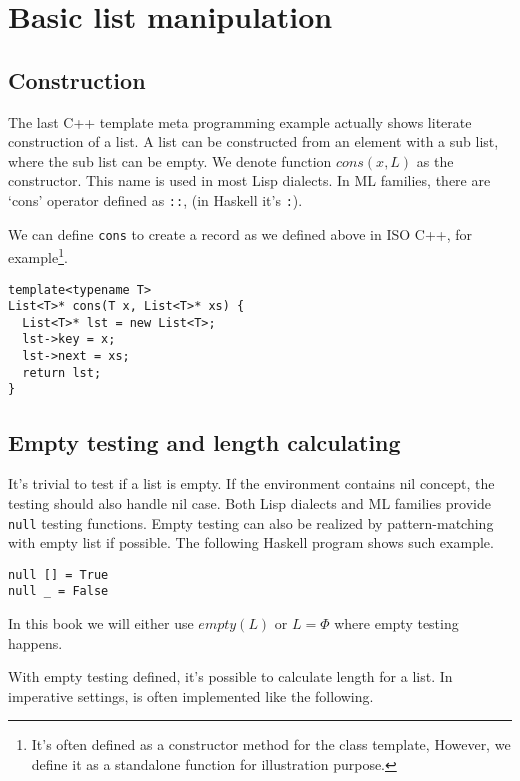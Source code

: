 \documentclass{article}
\begin{document}
\section{Basic list manipulation}

\subsection{Construction}

The last C++ template meta programming example actually shows literate construction of a list.
A list can be constructed from an element with a sub list, where the sub list can be empty.
We denote function $cons(x, L)$ as the constructor. This name is used in most Lisp dialects.
In ML families, there are `cons' operator defined as \verb|::|, (in Haskell it's \verb|:|).

We can define \verb|cons| to create a record as we defined above in ISO C++, for example\footnote{
It's often defined as a constructor method for the class template, However, we define it as a standalone
function for illustration purpose.}.

\lstset{language=C++}
\begin{lstlisting}
template<typename T>
List<T>* cons(T x, List<T>* xs) {
  List<T>* lst = new List<T>;
  lst->key = x;
  lst->next = xs;
  return lst;
}
\end{lstlisting}

\subsection{Empty testing and length calculating}

It's trivial to test if a list is empty. If the environment contains nil concept, the testing should
also handle nil case. Both Lisp dialects and ML families provide \verb|null| testing functions.
Empty testing can also be realized by pattern-matching with empty list if possible. The following
Haskell program shows such example.

\lstset{language=Haskell}
\begin{lstlisting}
null [] = True
null _ = False
\end{lstlisting}

In this book we will either use $empty(L)$ or $L = \Phi$ where empty testing happens.

With empty testing defined, it's possible to calculate length for a list. 
In imperative settings,  is often implemented like the following.
\end{document}
